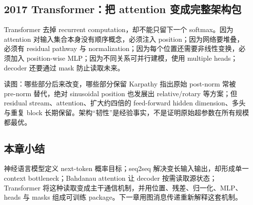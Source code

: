 

\subsection{2017 Transformer：把 attention 变成完整架构包}

Transformer 去掉 recurrent computation，却不能只留下一个 softmax。因为 attention 对输入集合本身没有顺序概念，必须注入 position；因为网络要堆叠，必须有 residual pathway 与 normalization；因为每个位置还需要非线性变换，必须加入 position-wise MLP；因为不同关系可并行建模，使用 multiple heads；decoder 还要通过 mask 防止读取未来。


\begin{knowledgebox}{读图：哪些部分后来改变，哪些部分保留}
Karpathy 指出原始 post-norm 常被 pre-norm 替代，绝对 sinusoidal position 也发展出 relative/rotary 等方案；但 residual stream、attention、扩大约四倍的 feed-forward hidden dimension、多头与重复 block 长期保留。架构“韧性”是经验事实，不是证明原始超参数在所有规模都最优。
\end{knowledgebox}

\subsection{本章小结}

神经语言模型定义 next-token 概率目标；seq2seq 解决变长输入输出，却形成单一 context bottleneck；Bahdanau attention 让 decoder 按需读取源状态；Transformer 将这种读取变成主干通信机制，并用位置、残差、归一化、MLP、heads 与 masks 组成可训练 package。下一章用图消息传递重新解释这套机制。

